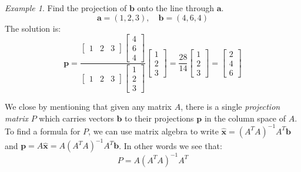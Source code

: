 \documentclass[11pt,oneside]{amsbook}
\theoremstyle{definition}
\theoremstyle{plain}
\theoremstyle{definition}
\theoremstyle{remark}
\newtheorem{example}[theorem]{Example}
\numberwithin{equation}{section}
\numberwithin{figure}{section}
\begin{document}
\begin{example}
  Find the projection of $\bm{b}$ onto the line through $\bm{a}$.
  \[\bm{a}=(1,2,3),\quad \bm{b}=(4,6,4)
  \]
  The solution is:
  \[\bm{p}=\frac{\begin{bmatrix}1&2&3\end{bmatrix}
  \begin{bmatrix}4\\6\\4\end{bmatrix}}
  {\begin{bmatrix}1&2&3\end{bmatrix}\begin{bmatrix}1\\2\\3\end{bmatrix}}
  \begin{bmatrix}1\\2\\3\end{bmatrix}
  =\frac{28}{14}\begin{bmatrix}1\\2\\3\end{bmatrix}
  =\begin{bmatrix}2\\4\\6\end{bmatrix}
  \]
\end{example}

We close by mentioning that given any matrix $A$, there is a single \emph{projection matrix} $P$ which carries vectors $\bm{b}$ to their projections $\bm{p}$ in the column space of $A$. To find a formula for $P$, we can use matrix algebra to write $\hat{\bm{x}}=(A^TA)^{-1}A^T\bm{b}$ and $\bm{p}=A\hat{\bm{x}}=A(A^TA)^{-1}A^T\bm{b}$. In other words we see that:
\[P=A(A^TA)^{-1}A^T
\]
\end{document}
